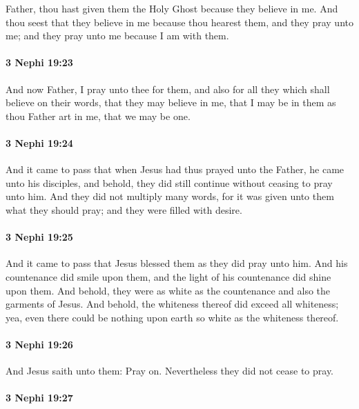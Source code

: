 			Father, thou hast given them the Holy Ghost because they believe in me.
			And thou seest that they believe in me
			because thou hearest them, and they pray unto me;
			and they pray unto me because I am with them.

		\paragraph{3 Nephi 19:23} %
			\label{3NEPHI-19-23}

			And now Father, I pray unto thee for them,
			and also for all they which shall believe on their words,
			that they may believe in me,
			that I may be in them as thou Father art in me,
			that we may be one.

		\paragraph{3 Nephi 19:24} %
			\label{3NEPHI-19-24}

			And it came to pass that
			when Jesus had thus prayed unto the Father,
			he came unto his disciples,
			and behold, they did still continue without ceasing to pray unto him.
			And they did not multiply many words,
			for it was given unto them what they should pray;
			and they were filled with desire.

		\paragraph{3 Nephi 19:25} %
			\label{3NEPHI-19-25}

			And it came to pass that Jesus blessed them as they did pray unto him.
			And his countenance did smile upon them,
			and the light of his countenance did shine upon them.
			And behold, they were as white as the countenance
			and also the garments of Jesus.
			And behold, the whiteness thereof did exceed all whiteness;
			yea, even there could be nothing upon earth so white as the whiteness thereof.

		\paragraph{3 Nephi 19:26} %
			\label{3NEPHI-19-26}

			And Jesus saith unto them: Pray on.
			Nevertheless they did not cease to pray.

		\paragraph{3 Nephi 19:27} %
			\label{3NEPHI-19-27}

